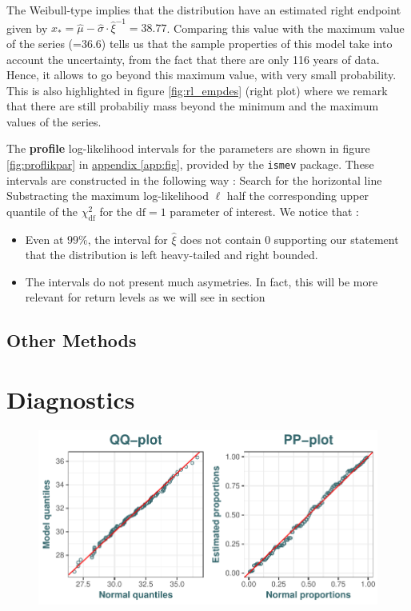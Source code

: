 The Weibull-type implies that the distribution have an estimated right endpoint given by $\hat{x}_*=\hat{\mu}-\hat{\sigma}\cdot\hat{\xi}^{-1}=38.77$. Comparing this value with the maximum value of the series (=36.6) tells us that the sample properties of this model take into account the uncertainty, from the fact that there are only 116 years of data. Hence, it allows to go beyond this maximum value, with very small probability. This is also highlighted in figure \ref{fig:rl_empdes} (right plot) where we remark that there are still probabiliy mass beyond the minimum and the maximum values of the series.

The \textbf{profile} log-likelihood intervals for the parameters are shown in figure \ref{fig:proflikpar} in \hyperref[app:fig]{appendix \ref{app:fig}}, provided by the \texttt{ismev} package. These intervals are constructed in the following way : Search for the horizontal line Substracting the maximum log-likelihood $\ell$ half the corresponding upper quantile of the $\chi^2_{\text{df}}$ for the $\text{df}=1$ parameter of interest. We notice that :
\begin{itemize}
\item Even at $99\%$, the interval for $\hat{\xi}$ does not contain 0 supporting our statement that the distribution is left heavy-tailed and right bounded.
\item The intervals do not present much asymetries. In fact, this will be more relevant for return levels as we will see in section
\end{itemize}


\subsection{Other Methods}


\section{Diagnostics}

\begin{figure}[!htb]
\centering	\includegraphics[width=.7\linewidth]{pp_qqplot.pdf}\caption{}\label{fig:ppqqplot}
\end{figure}


